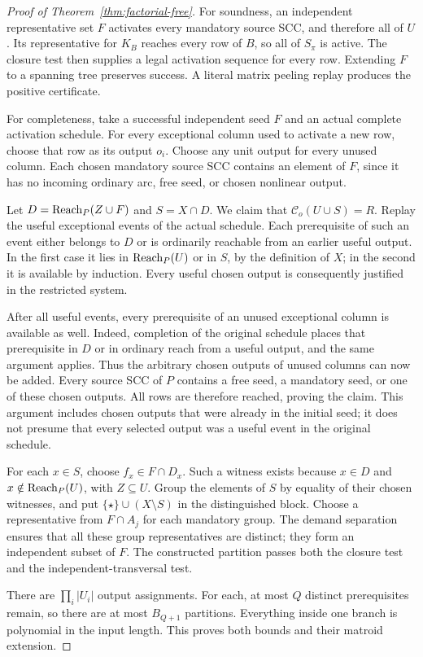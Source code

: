 \begin{proof}[Proof of Theorem~\ref{thm:factorial-free}]
For soundness, an independent representative set $F$ activates every
mandatory source SCC, and therefore all of $U$. Its representative for
$K_B$ reaches every row of $B$, so all of $S_\pi$ is active. The closure
test then supplies a legal activation sequence for every row. Extending
$F$ to a spanning tree preserves success. A literal matrix peeling replay
produces the positive certificate.

For completeness, take a successful independent seed $F$ and an actual
complete activation schedule. For every exceptional column used to
activate a new row, choose that row as its output $o_i$. Choose any unit
output for every unused column. Each chosen mandatory source SCC contains
an element of $F$, since it has no incoming ordinary arc, free seed, or
chosen nonlinear output.

Let $D=\operatorname{Reach}_P(Z\cup F)$ and $S=X\cap D$. We claim that
$\mathcal C_o(U\cup S)=R$. Replay the useful exceptional events of
the actual schedule. Each prerequisite of such an event either belongs
to $D$ or is ordinarily reachable from an earlier useful output. In the
first case it lies in $\operatorname{Reach}_P(U)$ or in $S$, by the definition of $X$;
in the second it is available by induction. Every useful chosen output
is consequently justified in the restricted system.

After all useful events, every prerequisite of an unused exceptional
column is available as well. Indeed, completion of the original schedule
places that prerequisite in $D$ or in ordinary reach from a useful
output, and the same argument applies. Thus the arbitrary chosen outputs
of unused columns can now be added. Every source SCC of $P$ contains a
free seed, a mandatory seed, or one of these chosen outputs. All rows
are therefore reached, proving the claim. This argument includes chosen
outputs that were already in the initial seed; it does not presume that
every selected output was a useful event in the original schedule.

For each $x\in S$, choose $f_x\in F\cap D_x$. Such a witness exists
because $x\in D$ and $x\notin\operatorname{Reach}_P(U)$, with $Z\subseteq U$.
Group the elements of $S$ by equality of their chosen witnesses, and put
$\{\star\}\cup(X\setminus S)$ in the distinguished block. Choose a
representative from $F\cap A_j$ for each mandatory group. The demand
separation ensures that all these group representatives are distinct;
they form an independent subset of $F$. The constructed partition passes
both the closure test and the independent-transversal test.

There are $\prod_i|U_i|$ output assignments. For each, at most $Q$
distinct prerequisites remain, so there are at most $B_{Q+1}$ partitions.
Everything inside one branch is polynomial in the input length. This
proves both bounds and their matroid extension.
\end{proof}

